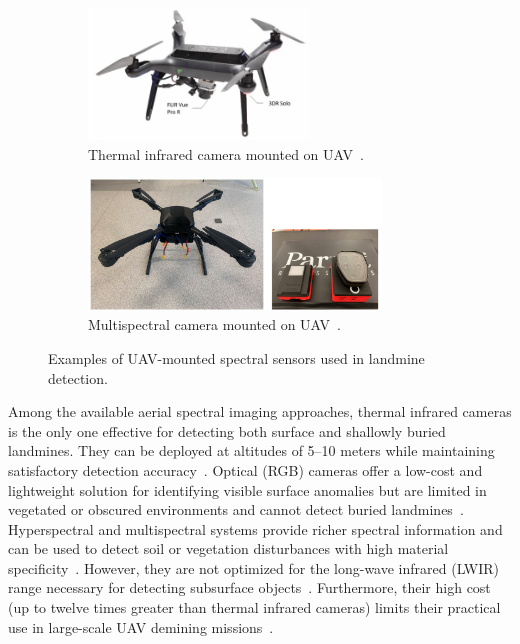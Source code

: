 \begin{figure}[h!]
    \centering
    \begin{subfigure}[b]{0.48\linewidth}
        \centering
        \includegraphics[height=3.5cm]{figs/Huirui/thermal_camera_drone.png}
        \caption{Thermal infrared camera mounted on UAV~\cite{nikulin2018detection}.}
        \label{fig:thermal_camera_drone}
    \end{subfigure}
    \hfill
    \begin{subfigure}[b]{0.48\linewidth}
        \centering
        \includegraphics[height=3.5cm]{figs/Huirui/multispectral_drone.png}
        \caption{Multispectral camera mounted on UAV~\cite{qiu2023joint}.}
        \label{fig:optical_camera_drone}
    \end{subfigure}
    \caption{Examples of UAV-mounted spectral sensors used in landmine detection.}
    \label{fig:spectral_camera_drones}
\end{figure}

Among the available aerial spectral imaging approaches, thermal infrared cameras is the only one effective for detecting both surface and shallowly buried landmines. They can be deployed at altitudes of 5--10 meters while maintaining satisfactory detection accuracy~\cite{TENORIOTAMAYO2024105567,rs15040967}. Optical (RGB) cameras offer a low-cost and lightweight solution for identifying visible surface anomalies but are limited in vegetated or obscured environments and cannot detect buried landmines~\cite{Baur2021HowTI,6842242,rs16122046}. Hyperspectral and multispectral systems provide richer spectral information and can be used to detect soil or vegetation disturbances with high material specificity~\cite{10765909}. However, they are not optimized for the long-wave infrared (LWIR) range necessary for detecting subsurface objects~\cite{ptsa-qj43-23}. Furthermore, their high cost (up to twelve times greater than thermal infrared cameras) limits their practical use in large-scale UAV demining missions~\cite{rs15040967}.



